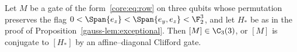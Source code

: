 Let $M$ be a gate of the form~\eqref{core:eq:row} on three qubits whose permutation preserves the flag $0<\Span\{e_z\}<\Span\{e_y,e_z\}<\F_2^3$, and let $H_*$ be as in the proof of Proposition~\ref{gauss-lem:exceptional}. Then $[M]\in\C_3(3)$, or $[M]$ is conjugate to $[H_*]$ by an affine--diagonal Clifford gate.
